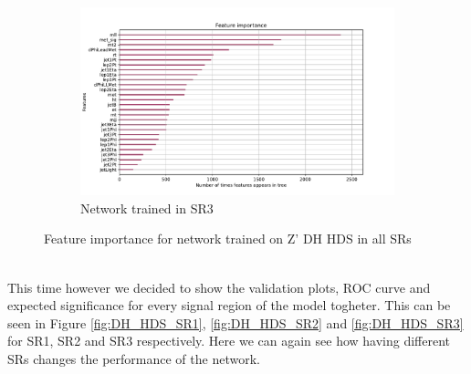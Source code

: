 \documentclass[12pt, a4paper]{book}
\begin{document}
\begin{figure}[!ht]
\begin{subfigure}[b]{0.7\textwidth}
      \end{subfigure}
      \hfill
      \begin{subfigure}[b]{0.7\textwidth}
         \centering
         \includegraphics[width=1\textwidth]{XGBoost/Model_independent/150/feature_importance/weight.pdf}\caption{Network trained in SR3}
      \end{subfigure}
   \caption{Feature importance for network trained on Z' DH HDS in all SRs}\label{fig:DH_HDS_feat_SRs}
\end{figure}
\\This time however we decided to show the validation plots, ROC curve and expected significance for every signal region of the model togheter. This can be seen in Figure \ref{fig:DH_HDS_SR1}, \ref{fig:DH_HDS_SR2} and \ref{fig:DH_HDS_SR3} for SR1, SR2 and SR3 respectively. 
Here we can again see how having different SRs changes the performance of the network.\\
\end{document}
